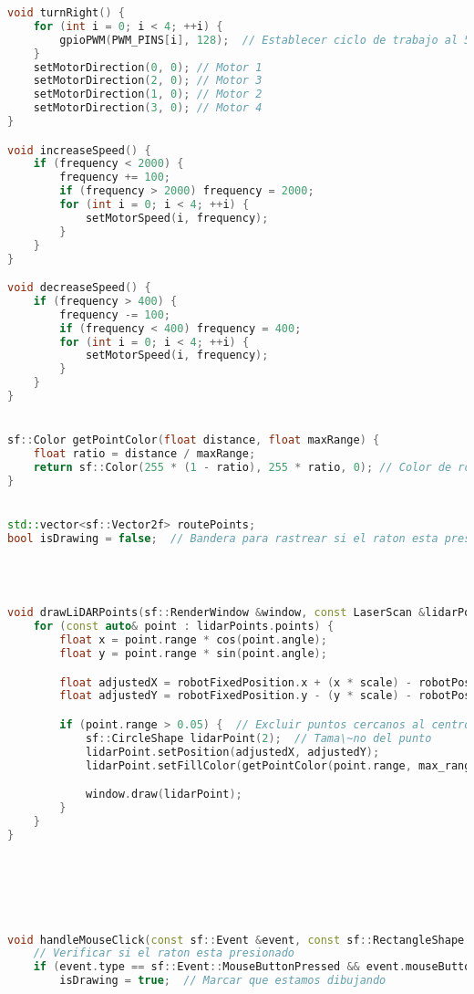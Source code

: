 \begin{lstlisting}[language={C++}, caption={Cuarto ajuste de c\'odigo}, label={CuartoAjuste}]
void turnRight() {
    for (int i = 0; i < 4; ++i) {
        gpioPWM(PWM_PINS[i], 128);  // Establecer ciclo de trabajo al 50%
    }
    setMotorDirection(0, 0); // Motor 1
    setMotorDirection(2, 0); // Motor 3
    setMotorDirection(1, 0); // Motor 2
    setMotorDirection(3, 0); // Motor 4
}

void increaseSpeed() {
    if (frequency < 2000) {
        frequency += 100;
        if (frequency > 2000) frequency = 2000;
        for (int i = 0; i < 4; ++i) {
            setMotorSpeed(i, frequency);
        }
    }
}

void decreaseSpeed() {
    if (frequency > 400) {
        frequency -= 100;
        if (frequency < 400) frequency = 400;
        for (int i = 0; i < 4; ++i) {
            setMotorSpeed(i, frequency);
        }
    }
}


sf::Color getPointColor(float distance, float maxRange) {
    float ratio = distance / maxRange;
    return sf::Color(255 * (1 - ratio), 255 * ratio, 0); // Color de rojo a verde
}


std::vector<sf::Vector2f> routePoints;
bool isDrawing = false;  // Bandera para rastrear si el raton esta presionado




void drawLiDARPoints(sf::RenderWindow &window, const LaserScan &lidarPoints, const sf::Vector2f &robotPosition, float scale, float max_range) {
    for (const auto& point : lidarPoints.points) {
        float x = point.range * cos(point.angle);
        float y = point.range * sin(point.angle);

        float adjustedX = robotFixedPosition.x + (x * scale) - robotPosition.x;
        float adjustedY = robotFixedPosition.y - (y * scale) - robotPosition.y;  // Invertir Y para la pantalla

        if (point.range > 0.05) {  // Excluir puntos cercanos al centro
            sf::CircleShape lidarPoint(2);  // Tama\~no del punto
            lidarPoint.setPosition(adjustedX, adjustedY);
            lidarPoint.setFillColor(getPointColor(point.range, max_range));  // Color basado en la distancia

            window.draw(lidarPoint);
        }
    }
}






void handleMouseClick(const sf::Event &event, const sf::RectangleShape &minimap) {
    // Verificar si el raton esta presionado
    if (event.type == sf::Event::MouseButtonPressed && event.mouseButton.button == sf::Mouse::Left) {
        isDrawing = true;  // Marcar que estamos dibujando


\end{lstlisting}
